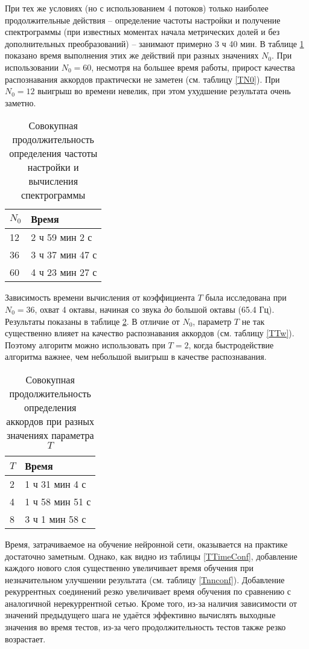 При тех же условиях (но с использованием 4 потоков) только наиболее
продолжительные действия -- определение частоты настройки и получение
спектрограммы (при известных моментах начала метрических долей и без
дополнительных преобразований) -- занимают примерно 3 ч 40 мин. В таблице
\ref{TTimeN0} показано время выполнения этих же действий при разных значениях
$N_0$. При использовании $N_0=60$, несмотря на большее время работы, прирост
качества распознавания аккордов практически не заметен (см. таблицу \ref{TN0}).
При $N_0=12$ выигрыш во времени невелик, при этом ухудшение результата очень
заметно.

\begin{table} [htbp]
  \centering
  \parbox{15cm}{\caption{Совокупная продолжительность определения частоты
  настройки и вычисления спектрограммы}
  \label{TTimeN0}}
  \begin{tabular}{|l|l|}
  \hline
  $N_0$ & Время \\
  \hline
  12 & 2 ч 59 мин 2 с \\
  36 & 3 ч 37 мин 47 с \\
  60 & 4 ч 23 мин 27 с\\
  \hline
  \end{tabular}
\end{table}

Зависимость времени вычисления от коэффициента $T$ была исследована при
$N_0=36$, охват 4 октавы, начиная со звука \emph{до} большой октавы (65.4 Гц).
Результаты показаны в таблице \ref{TTimeT}. В отличие от $N_0$, параметр $T$ не
так существенно влияет на качество распознавания аккордов (см. таблицу
\ref{TTw}). Поэтому алгоритм можно использовать при $T=2$, когда быстродействие
алгоритма важнее, чем небольшой выигрыш в качестве распознавания.

\begin{table} [htbp]
  \centering
  \parbox{15cm}{\caption{Совокупная продолжительность определения аккордов при
  разных значениях параметра $T$}
  \label{TTimeT}}
  \begin{tabular}{|l|l|}
  \hline
  $T$ & Время \\
  \hline
  2 & 1 ч 31 мин 4 с \\
  4 & 1 ч 58 мин 51 с \\
  8 & 3 ч 1 мин 58 с \\
  \hline
  \end{tabular}
\end{table}

Время, затрачиваемое на обучение нейронной сети, оказывается на практике
достаточно заметным. Однако, как видно из таблицы \ref{TTimeConf}, добавление
каждого нового слоя существенно увеличивает время обучения при незначительном
улучшении результата (см. таблицу \ref{Tnnconf}). Добавление рекуррентных
соединений резко увеличивает время обучения по сравнению с аналогичной
нерекуррентной сетью. Кроме того, из-за наличия зависимости от значений
предыдущего шага не удаётся эффективно вычислять выходные значения во время
тестов, из-за чего продолжительность тестов также резко возрастает.

